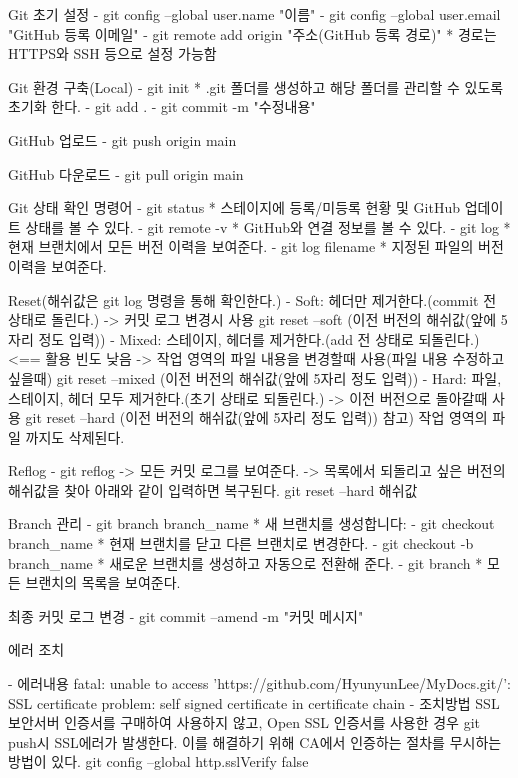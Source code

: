 
Git 초기 설정
  - git config --global user.name "이름"
  - git config --global user.email "GitHub 등록 이메일"
  - git remote add origin "주소(GitHub 등록 경로)"
    * 경로는 HTTPS와 SSH 등으로 설정 가능함

Git 환경 구축(Local)
  - git init 
    * .git 폴더를 생성하고 해당 폴더를 관리할 수 있도록 초기화 한다.
  - git add .
  - git commit -m "수정내용"

GitHub 업로드
  - git push origin main

GitHub 다운로드
  - git pull origin main

Git 상태 확인 명령어
  - git status
    * 스테이지에 등록/미등록 현황 및 GitHub 업데이트 상태를 볼 수 있다.
  - git remote -v 
    * GitHub와 연결 정보를 볼 수 있다.
  - git log
    * 현재 브랜치에서 모든 버전 이력을 보여준다.
  - git log filename
    * 지정된 파일의 버전 이력을 보여준다.

Reset(해쉬값은 git log 명령을 통해 확인한다.)
  - Soft: 헤더만 제거한다.(commit 전 상태로 돌린다.)
    -> 커밋 로그 변경시 사용
    git reset --soft (이전 버전의 해쉬값(앞에 5자리 정도 입력))
  - Mixed: 스테이지, 헤더를 제거한다.(add 전 상태로 되돌린다.)   <== 활용 빈도 낮음
    -> 작업 영역의 파일 내용을 변경할때 사용(파일 내용 수정하고 싶을때)
    git reset --mixed (이전 버전의 해쉬값(앞에 5자리 정도 입력))
  - Hard: 파일, 스테이지, 헤더 모두 제거한다.(초기 상태로 되돌린다.)
    -> 이전 버전으로 돌아갈때 사용
    git reset --hard (이전 버전의 해쉬값(앞에 5자리 정도 입력))
    참고) 작업 영역의 파일 까지도 삭제된다.

Reflog
  - git reflog
    -> 모든 커밋 로그를 보여준다.
    -> 목록에서 되돌리고 싶은 버전의 해쉬값을 찾아 아래와 같이 입력하면 복구된다.
       git reset --hard 해쉬값

Branch 관리
  - git branch branch_name
    * 새 브랜치를 생성합니다:
  - git checkout branch_name
    * 현재 브랜치를 닫고 다른 브랜치로 변경한다.
  - git checkout -b branch_name
    * 새로운 브랜치를 생성하고 자동으로 전환해 준다.
  - git branch
    * 모든 브랜치의 목록을 보여준다.

최종 커밋 로그 변경
  - git commit --amend -m "커밋 메시지"

에러 조치

- 에러내용 
   fatal: unable to access 'https://github.com/HyunyunLee/MyDocs.git/': SSL certificate problem: self signed certificate in certificate chain
- 조치방법
   SSL 보안서버 인증서를 구매하여 사용하지 않고, Open SSL 인증서를 사용한 경우 git push시 SSL에러가 발생한다.
   이를 해결하기 위해 CA에서 인증하는 절차를 무시하는 방법이 있다.
   git config --global http.sslVerify false
